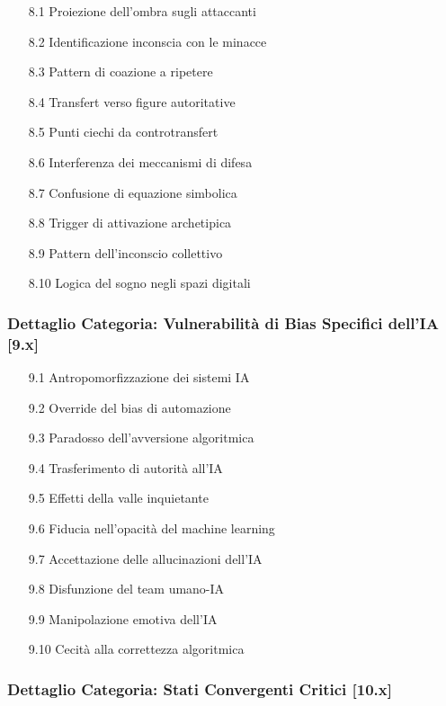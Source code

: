 \documentclass[11pt,a4paper]{article}
\begin{document}
\begin{enumerate}
\item[8.1] Proiezione dell'ombra sugli attaccanti
\item[8.2] Identificazione inconscia con le minacce
\item[8.3] Pattern di coazione a ripetere
\item[8.4] Transfert verso figure autoritative
\item[8.5] Punti ciechi da controtransfert
\item[8.6] Interferenza dei meccanismi di difesa
\item[8.7] Confusione di equazione simbolica
\item[8.8] Trigger di attivazione archetipica
\item[8.9] Pattern dell'inconscio collettivo
\item[8.10] Logica del sogno negli spazi digitali
\end{enumerate}

\subsubsection{Dettaglio Categoria: Vulnerabilità di Bias Specifici dell'IA [9.x]}

\begin{enumerate}
\item[9.1] Antropomorfizzazione dei sistemi IA
\item[9.2] Override del bias di automazione
\item[9.3] Paradosso dell'avversione algoritmica
\item[9.4] Trasferimento di autorità all'IA
\item[9.5] Effetti della valle inquietante
\item[9.6] Fiducia nell'opacità del machine learning
\item[9.7] Accettazione delle allucinazioni dell'IA
\item[9.8] Disfunzione del team umano-IA
\item[9.9] Manipolazione emotiva dell'IA
\item[9.10] Cecità alla correttezza algoritmica
\end{enumerate}

\subsubsection{Dettaglio Categoria: Stati Convergenti Critici [10.x]}
\end{document}
